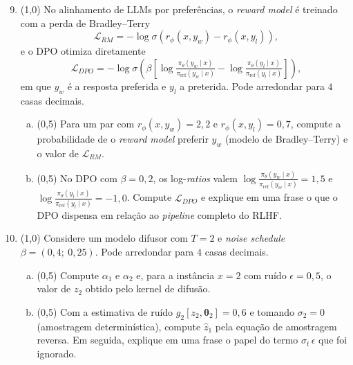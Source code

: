 \documentclass[11pt,a4paper]{article}
\newcommand{\thetav}{\boldsymbol{\theta}}
\begin{document}
\begin{enumerate}[1)]
\setcounter{enumi}{8}

\item (1{,}0) No alinhamento de LLMs por preferências, o \textit{reward model} é treinado com a perda de Bradley--Terry
\[
\mathcal{L}_{RM} = -\log \sigma\!\left(r_\phi(x, y_w) - r_\phi(x, y_l)\right),
\]
e o DPO otimiza diretamente
\[
\mathcal{L}_{DPO} = -\log \sigma\!\left(\beta\left[\log\tfrac{\pi_\theta(y_w \mid x)}{\pi_{\text{ref}}(y_w \mid x)} - \log\tfrac{\pi_\theta(y_l \mid x)}{\pi_{\text{ref}}(y_l \mid x)}\right]\right),
\]
em que $y_w$ é a resposta preferida e $y_l$ a preterida. Pode arredondar para $4$ casas decimais.

\begin{enumerate}[a)]
    \item (0{,}5) Para um par com $r_\phi(x, y_w) = 2{,}2$ e $r_\phi(x, y_l) = 0{,}7$, compute a probabilidade de o \textit{reward model} preferir $y_w$ (modelo de Bradley--Terry) e o valor de $\mathcal{L}_{RM}$.
    \vspace{3cm}

    \item (0{,}5) No DPO com $\beta = 0{,}2$, os log-\textit{ratios} valem $\log\tfrac{\pi_\theta(y_w \mid x)}{\pi_{\text{ref}}(y_w \mid x)} = 1{,}5$ e $\log\tfrac{\pi_\theta(y_l \mid x)}{\pi_{\text{ref}}(y_l \mid x)} = -1{,}0$. Compute $\mathcal{L}_{DPO}$ e explique em uma frase o que o DPO dispensa em relação ao \textit{pipeline} completo do RLHF.
    \vspace{3.4cm}
\end{enumerate}

\item (1{,}0) Considere um modelo difusor com $T = 2$ e \textit{noise schedule} $\beta = (0{,}4;\ 0{,}25)$. Pode arredondar para $4$ casas decimais.

\begin{enumerate}[a)]
    \item (0{,}5) Compute $\alpha_1$ e $\alpha_2$ e, para a instância $x = 2$ com ruído $\epsilon = 0{,}5$, o valor de $z_2$ obtido pelo kernel de difusão.
    \vspace{3cm}

    \item (0{,}5) Com a estimativa de ruído $g_2[z_2, \thetav_2] = 0{,}6$ e tomando $\sigma_2 = 0$ (amostragem determinística), compute $\hat{z}_1$ pela equação de amostragem reversa. Em seguida, explique em uma frase o papel do termo $\sigma_t\,\epsilon$ que foi ignorado.
    \vspace{3.4cm}
\end{enumerate}

\end{enumerate}
\end{document}
